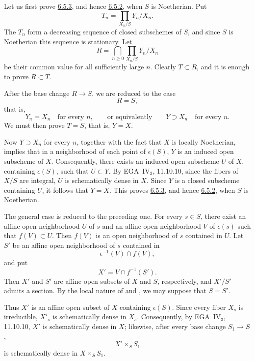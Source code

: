 Let us first prove \hyperref[cor:sga3-VIB-6.5.3]{6.5.3}, and
hence \hyperref[thm:sga3-VIB-6.5.2]{6.5.2}, when \(S\) is
Noetherian. Put
\label{eq:sga3-VIB-6.5.3-Tn}%
\[
  T_n=\prod_{X_n/S}Y_n/X_n.
\]
The \(T_n\) form a decreasing sequence of closed subschemes of
\(S\), and since \(S\) is Noetherian this sequence is stationary.
Let
\label{eq:sga3-VIB-6.5.3-R}%
\[
  R=\bigcap_{n\geq0}\prod_{X_n/S}Y_n/X_n
\]
be their common value for all sufficiently large \(n\). Clearly
\(T\subset R\), and it is enough to prove \(R\subset T\).

After the base change \(R\to S\), we are reduced to the case
\[
  R=S,
\]
that is,
\[
  Y_n=X_n\quad\text{for every \(n\)},
  \qquad\text{or equivalently}\qquad
  Y\supset X_n\quad\text{for every \(n\)}.
\]
We must then prove \(T=S\), that is, \(Y=X\).

Now \(Y\supset X_n\) for every \(n\), together with the fact that
\(X\) is locally Noetherian, implies that in a neighborhood of
each point of \(\epsilon(S)\), \(Y\) is an induced open subscheme
of \(X\).%
Consequently, there exists an induced open subscheme \(U\) of
\(X\), containing \(\epsilon(S)\), such that \(U\subset Y\). By
EGA~IV\(_3\), 11.10.10, since the fibers of \(X/S\) are integral,
\(U\) is schematically dense in \(X\). Since \(Y\) is a closed
subscheme containing \(U\), it follows that \(Y=X\). This proves
\hyperref[cor:sga3-VIB-6.5.3]{6.5.3}, and hence
\hyperref[thm:sga3-VIB-6.5.2]{6.5.2}, when \(S\) is Noetherian.

The general case is reduced to the preceding one. For every
\(s\in S\), there exist an affine open neighborhood \(U\) of
\(s\) and an affine open neighborhood \(V\) of \(\epsilon(s)\)
such that \(f(V)\subset U\). Then \(f(V)\) is an open
neighborhood of \(s\) contained in \(U\). Let \(S'\) be an affine
open neighborhood of \(s\) contained in
\[
  \epsilon^{-1}(V)\cap f(V),
\]
and put
\[
  X'=V\cap f^{-1}(S').
\]
Then \(X'\) and \(S'\) are affine open subsets of \(X\) and \(S\),
respectively, and \(X'/S'\) admits a section. By the local nature
of  and , we may suppose that \(S=S'\).

Thus \(X'\) is an affine open subset of \(X\) containing
\(\epsilon(S)\). Since every fiber \(X_s\) is irreducible,
\(X'_s\) is schematically dense in \(X_s\). Consequently, by
EGA~IV\(_3\), 11.10.10, \(X'\) is schematically dense in \(X\);
likewise, after every base change \(S_1\to S\),
\[
  X'\times_S S_1
\]
is schematically dense in \(X\times_S S_1\).

